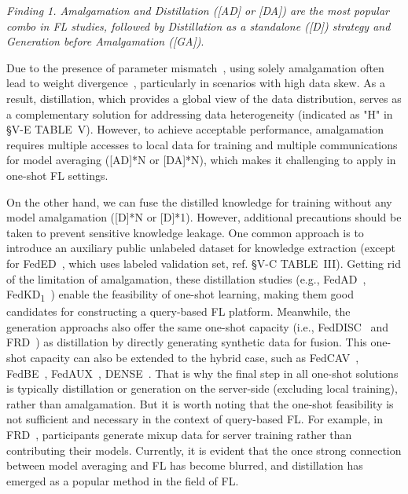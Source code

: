 \documentclass[journal]{IEEEtran}
\begin{document}
\begin{tcolorbox}
\textit{Finding 1. Amalgamation and Distillation ([AD] or [DA]) are the most popular combo in FL studies, followed by Distillation as a standalone ([D]) strategy and Generation before Amalgamation ([GA])}.
\end{tcolorbox}

Due to the presence of parameter mismatch~\cite{yu2021fed2, wang2020federated, yurochkin2019statistical}, using solely amalgamation often lead to weight divergence~\cite{Li2020On, tan2022towards}, particularly in scenarios with high data skew. 
As a result, distillation, which provides a global view of the data distribution, serves as a complementary solution for addressing data heterogeneity (indicated as "H" in \S{V-E} TABLE~V).
However, to achieve acceptable performance, amalgamation requires multiple accesses to local data for training and multiple communications for model averaging ([AD]*N or [DA]*N), which makes it challenging to apply in one-shot FL settings.

On the other hand, we can fuse the distilled knowledge for training without any model amalgamation ([D]*N or [D]*1).
However, additional precautions should be taken to prevent sensitive knowledge leakage.
One common approach is to introduce an auxiliary public unlabeled dataset for knowledge extraction (except for FedED~\cite{sui2020feded}, which uses labeled validation set, ref. \S{V-C} TABLE~III).
Getting rid of the limitation of amalgamation, these distillation studies (e.g., FedAD~\cite{gong2021ensemble}, FedKD\textsubscript{1}~\cite{gong2022preserving}) enable the feasibility of one-shot learning, making them good candidates for constructing a query-based FL platform.
Meanwhile, the generation approachs also offer the same one-shot capacity (i.e., FedDISC~\cite{yang2023exploring} and FRD~\cite{cha2019federated}) as distillation by directly generating synthetic data for fusion.
This one-shot capacity can also be extended to the hybrid case, such as FedCAV~\cite{heinbaugh2023data}, FedBE~\cite{chen2020fedbe}, FedAUX~\cite{sattler2021fedaux}, DENSE~\cite{zhang2022dense}.
That is why the final step in all one-shot solutions is typically distillation or generation on the server-side (excluding local training), rather than amalgamation.
But it is worth noting that the one-shot feasibility is not sufficient and necessary in the context of query-based FL.
For example, in FRD~\cite{cha2019federated}, participants generate mixup data for server training rather than contributing their models.
Currently, it is evident that the once strong connection between model averaging and FL has become blurred, and distillation has emerged as a popular method in the field of FL.
\end{document}
